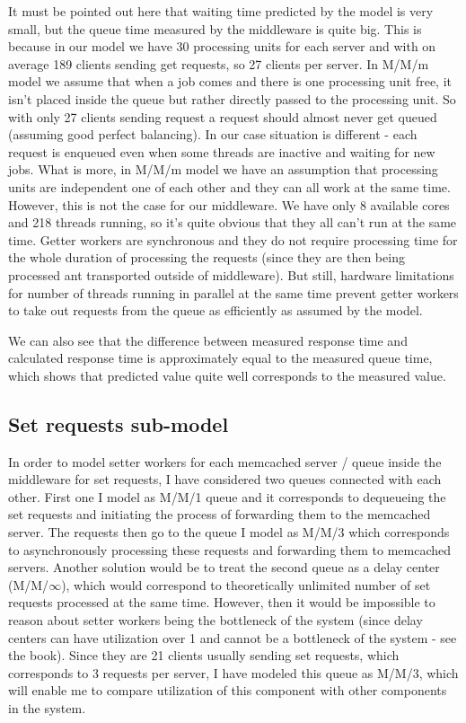 \documentclass[11pt]{article}
\begin{document}
It must be pointed out here that waiting time predicted by the model is very small, but the queue time measured by the middleware is quite big.
This is because in our model we have 30 processing units for each server and with on average 189 clients sending get requests, so 27 clients per server. In M/M/m model we assume that when a job comes and there is one processing unit free, it isn't placed inside the queue but rather directly passed to the processing unit. So with only 27 clients sending request a request should almost never get queued (assuming good perfect balancing). In our case situation is different - each request is enqueued even when some threads are inactive and waiting for new jobs. What is more, in M/M/m model we have an assumption that processing units are independent one of each other and they can all work at the same time. However, this is not the case for our middleware. We have only 8 available cores and 218 threads running, so it's quite obvious that they all can't run at the same time. Getter workers are synchronous and they do not require processing time for the whole duration of processing the requests (since they are then being processed ant transported outside of middleware). But still, hardware limitations for number of threads running in parallel at the same time prevent getter workers to take out requests from the queue as efficiently as assumed by the model.

We can also see that the difference between measured response time and calculated response time is approximately equal to the measured queue time, which shows that predicted value quite well corresponds to the measured value.


\subsection{Set requests sub-model}

In order to model setter workers for each memcached server / queue inside the middleware for set requests, I have considered two queues connected with each other. First one I model as M/M/1 queue and it corresponds to dequeueing the set requests and initiating the process of forwarding them to the memcached server. The requests then go to the queue I model as M/M/3 which corresponds to asynchronously processing these requests and forwarding them to memcached servers. Another solution would be to treat the second queue as a delay center (M/M/$\infty$), which would correspond to theoretically unlimited number of set requests processed at the same time. However, then it would be impossible to reason about setter workers being the bottleneck of the system (since delay centers can have utilization over 1 and cannot be a bottleneck of the system - see the book). Since they are 21 clients usually sending set requests, which corresponds to 3 requests per server, I have modeled this queue as M/M/3, which will enable me to compare utilization of this component with other components in the system.
\end{document}
